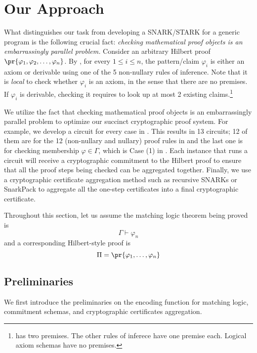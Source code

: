 \documentclass{article}
\begin{document}
\section{Our Approach}

What distinguishes our task from developing a SNARK/STARK for a generic program
is the following crucial fact:
\emph{checking mathematical proof objects is an embarrassingly parallel problem.}
Consider an arbitrary Hilbert proof
$\pr{\varphi_1,\varphi_2,\dots,\varphi_n}$.
By , for every $1 \le i \le n$,
the pattern/claim $\varphi_i$
is either an axiom or derivable using one of the 5 non-nullary rules of inference.
Note that it is \emph{local} to check whether $\varphi_i$ is an axiom,
in the sense that there are no premises.
If $\varphi_i$ is derivable, checking it requires to look up at most 2 existing claims.\footnote{\pruleMP has two premises. The other rules of inferece have one premise each. Logical axiom schemas have no premises. }

We utilize the fact that
checking mathematical proof objects is an embarrassingly parallel problem
to optimize our succinct cryptographic proof system.
For example, we develop a circuit for every case in .
This results in 13 circuits; 12 of them are for the 12
(non-nullary and nullary) proof rules in 
and the last one is for checking membership $\varphi \in \Gamma$,
which is Case (1) in .
Each instance that runs a circuit will receive a cryptographic commitment
to the Hilbert proof to ensure that all the proof steps being checked
can be aggregated together.
Finally, we use a cryptographic certificate aggregation method such as
recursive SNARKs or SnarkPack
to aggregate all the one-step certificates into a final cryptographic certificate.

Throughout this section, let us assume
the matching logic theorem being proved is
\begin{equation}
\label{eq:goal}
\Gamma \vdash \varphi_n
\end{equation}
and a corresponding Hilbert-style proof is
\begin{equation}
\Pi = \pr{\varphi_1,\dots,\varphi_n}
\end{equation}

\subsection{Preliminaries}

We first introduce the preliminaries on the encoding function for matching logic,
commitment schemas, and cryptographic certificates aggregation.
\end{document}

